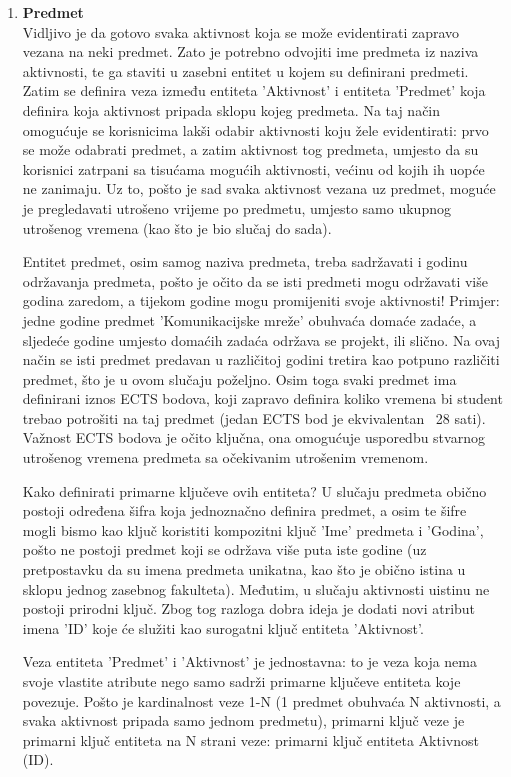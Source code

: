 \documentclass[times, utf8, zavrsni, numeric]{fer}
\begin{document}
\begin{enumerate}[leftmargin=*]
\item \textbf{Predmet}\\
Vidljivo je da gotovo svaka aktivnost koja se može evidentirati zapravo vezana na neki predmet. Zato je potrebno odvojiti ime predmeta iz naziva aktivnosti, te ga staviti u zasebni entitet u kojem su definirani predmeti. Zatim se definira veza između entiteta 'Aktivnost' i entiteta 'Predmet' koja definira koja aktivnost pripada sklopu kojeg predmeta. Na taj način omogućuje se korisnicima lakši odabir aktivnosti koju žele evidentirati: prvo se može odabrati predmet, a zatim aktivnost tog predmeta, umjesto da su korisnici zatrpani sa tisućama mogućih aktivnosti, većinu od kojih ih uopće ne zanimaju. Uz to, pošto je sad svaka aktivnost vezana uz predmet, moguće je pregledavati utrošeno vrijeme po predmetu, umjesto samo ukupnog utrošenog vremena (kao što je bio slučaj do sada).

Entitet predmet, osim samog naziva predmeta, treba sadržavati i godinu održavanja predmeta, pošto je očito da se isti predmeti mogu održavati više godina zaredom, a tijekom godine mogu promijeniti svoje aktivnosti! Primjer: jedne godine predmet 'Komunikacijske mreže' obuhvaća domaće zadaće, a sljedeće godine umjesto domaćih zadaća održava se projekt, ili slično. Na ovaj način se isti predmet predavan u različitoj godini tretira kao potpuno različiti predmet, što je u ovom slučaju poželjno. Osim toga svaki predmet ima definirani iznos ECTS bodova, koji zapravo definira koliko vremena bi student trebao potrošiti na taj predmet (jedan ECTS bod je ekvivalentan ~28 sati). Važnost ECTS bodova je očito ključna, ona omogućuje usporedbu stvarnog utrošenog vremena predmeta sa očekivanim utrošenim vremenom.

Kako definirati primarne ključeve ovih entiteta? U slučaju predmeta obično postoji određena šifra koja jednoznačno definira predmet, a osim te šifre mogli bismo kao ključ koristiti kompozitni ključ 'Ime' predmeta i 'Godina', pošto ne postoji predmet koji se održava više puta iste godine (uz pretpostavku da su imena predmeta unikatna, kao što je obično istina u sklopu jednog zasebnog fakulteta). Međutim, u slučaju aktivnosti uistinu ne postoji prirodni ključ. Zbog tog razloga dobra ideja je dodati novi atribut imena 'ID' koje će služiti kao surogatni ključ entiteta 'Aktivnost'.

Veza entiteta 'Predmet' i 'Aktivnost' je jednostavna: to je veza koja nema svoje vlastite atribute nego samo sadrži primarne ključeve entiteta koje povezuje. Pošto je kardinalnost veze 1-N (1 predmet obuhvaća N aktivnosti, a svaka aktivnost pripada samo jednom predmetu), primarni ključ veze je primarni ključ entiteta na N strani veze: primarni ključ entiteta Aktivnost (ID).


\end{enumerate}
\end{document}

